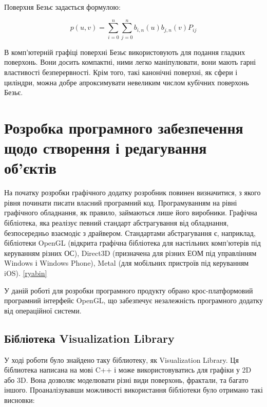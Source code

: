 \let\mypdfximage\pdfximage\def\pdfximage{\immediate\mypdfximage}\documentclass[14pt,a4paper]{extarticle}
\theoremstyle{definition}
\renewcommand{\[}{\begin{singlespace}\begin{equation*}}
\renewcommand{\]}{\end{equation*}\end{singlespace}}
\renewcommand{\+}{\discretionary{\mbox{\scriptsize$\hookleftarrow$}}{}{}}
\begin{document}
Поверхня Безьє задається формулою:
\[p(u,v)=\sum_{i=0}^n\sum_{j=0}^n b_{i,n}(u) b_{j,n}(v) P_{ij}\]

В комп'ютерній графіці поверхні Безьє використовують для подання гладких поверхонь. Вони досить компактні, ними легко маніпулювати, вони мають гарні властивості безперервності. Крім того, такі канонічні поверхні, як сфери і циліндри, можна добре апроксимувати невеликим числом кубічних поверхонь Безьє.

\section{Розробка програмного забезпечення щодо створення і редагування об'єктів}

На початку розробки графічного додатку розробник повинен визначитися, з якого рівня починати писати власний програмний код. Програмуванням на рівні графічного обладнання, як правило, займаються лише його виробники. Графічна бібліотека, яка реалізує певний стандарт абстрагування від обладнання, безпосередньо взаємодіє з драйвером. Стандартами абстрагування є, наприклад, бібліотеки OpenGL (відкрита графічна бібліотека для настільних комп'ютерів під керуванням різних ОС), Direct3D (призначена для різних ЕОМ під управлінням Windows і Windows Phone), Metal (для мобільних пристроїв під керуванням iOS). \ref{ryabin}

У даній роботі для розробки програмного продукту обрано крос-платформовий програмний інтерфейс OpenGL, що забезпечує незалежність програмного додатку від операційної системи.

\subsection{Бібліотека Visualization Library}

У ході роботи було знайдено таку біблиотеку, як Visualization Library. Ця біблиотека написана на мові C++ і може використовуватись для графіки у 2D або 3D. Вона дозволяє моделювати різні види поверхонь, фрактали, та багато іншого. Проаналізувавши можливості використання бібліотеки було отримано такі висновки:
\end{document}
